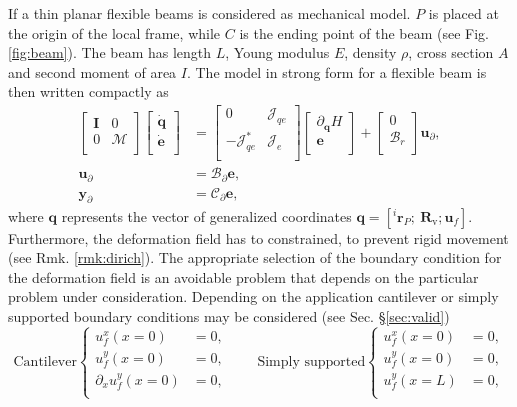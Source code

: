 \documentclass{svjour3}                     %
\newcommand{\secref}[1]{\S\ref{#1}}
\begin{document}
If a thin planar flexible beams is considered as mechanical model. $P$ is placed at the origin of the local frame, while $C$ is the ending point of the beam (see Fig. \ref{fig:beam}). The beam has length $L$, Young modulus $E$, density $\rho$, cross section $A$ and second moment of area $I$. The model in strong form for a flexible beam is then written compactly as 
\begin{equation}
\label{eq:EB_str_phdae}
\begin{aligned}
\begin{bmatrix}
\bm{I} & 0 \\
0 & \bm{\mathcal{M}} \\
\end{bmatrix}
\begin{bmatrix}
\dot{\bm{q}} \\
\dot{\bm{e}} \\
\end{bmatrix}
&= \begin{bmatrix}
0 & \bm{\mathcal{J}}_{qe} \\
-\bm{\mathcal{J}}_{qe}^* & \bm{\mathcal{J}}_e \\
\end{bmatrix}
\begin{bmatrix}
\partial_{\bm{q}} H \\
\bm{e}  \\
\end{bmatrix} + 
\begin{bmatrix}
0 \\
\bm{\mathcal{B}}_r \\
\end{bmatrix} \bm{u}_\partial, \\
\bm{u}_\partial &= \bm{\mathcal{B}}_{\partial} \bm{e}, \\
\bm{y}_\partial &= \bm{\mathcal{C}}_{\partial} \bm{e},
\end{aligned}
\end{equation}
where $\bm{q}$ represents the vector of generalized coordinates $\bm{q} = [^i\bm{r}_P; \ \bm{R}_{\text{v}}; \bm{u}_f]$.
Furthermore, the deformation field has to constrained, to prevent rigid movement (see Rmk. \ref{rmk:dirich}). The appropriate selection of the boundary condition for the deformation field is an avoidable problem that depends on the particular problem under consideration.  Depending on the application cantilever or simply supported boundary conditions may be considered (see Sec. \secref{sec:valid})
\begin{equation*}
	\text{Cantilever}
	\begin{cases}
	u_f^x(x=0) &= 0, \\
	u_f^y(x=0) &= 0, \\
	\partial_x u_f^y(x=0) &= 0, \\
	\end{cases} \qquad 
	\text{Simply supported}
	\begin{cases}
	u_f^x(x=0) &= 0, \\
	u_f^y(x=0) &= 0, \\
	u_f^y(x=L) &= 0, \\
	\end{cases}
\end{equation*}
\end{document}

